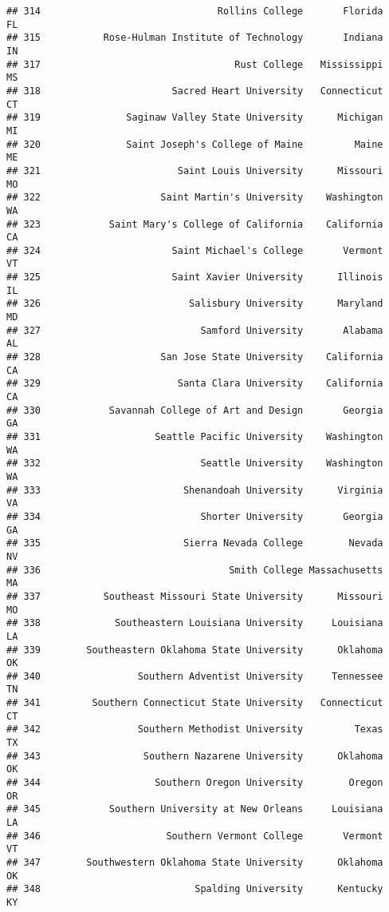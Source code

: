 \documentclass[
]{article}
\begin{document}
\begin{verbatim}
## 314                               Rollins College       Florida         FL
## 315           Rose-Hulman Institute of Technology       Indiana         IN
## 317                                  Rust College   Mississippi         MS
## 318                       Sacred Heart University   Connecticut         CT
## 319               Saginaw Valley State University      Michigan         MI
## 320               Saint Joseph's College of Maine         Maine         ME
## 321                        Saint Louis University      Missouri         MO
## 322                     Saint Martin's University    Washington         WA
## 323            Saint Mary's College of California    California         CA
## 324                       Saint Michael's College       Vermont         VT
## 325                       Saint Xavier University      Illinois         IL
## 326                          Salisbury University      Maryland         MD
## 327                            Samford University       Alabama         AL
## 328                     San Jose State University    California         CA
## 329                        Santa Clara University    California         CA
## 330            Savannah College of Art and Design       Georgia         GA
## 331                    Seattle Pacific University    Washington         WA
## 332                            Seattle University    Washington         WA
## 333                         Shenandoah University      Virginia         VA
## 334                            Shorter University       Georgia         GA
## 335                         Sierra Nevada College        Nevada         NV
## 336                                 Smith College Massachusetts         MA
## 337           Southeast Missouri State University      Missouri         MO
## 338             Southeastern Louisiana University     Louisiana         LA
## 339        Southeastern Oklahoma State University      Oklahoma         OK
## 340                 Southern Adventist University     Tennessee         TN
## 341         Southern Connecticut State University   Connecticut         CT
## 342                 Southern Methodist University         Texas         TX
## 343                  Southern Nazarene University      Oklahoma         OK
## 344                    Southern Oregon University        Oregon         OR
## 345            Southern University at New Orleans     Louisiana         LA
## 346                      Southern Vermont College       Vermont         VT
## 347        Southwestern Oklahoma State University      Oklahoma         OK
## 348                           Spalding University      Kentucky         KY

\end{verbatim}
\end{document}
